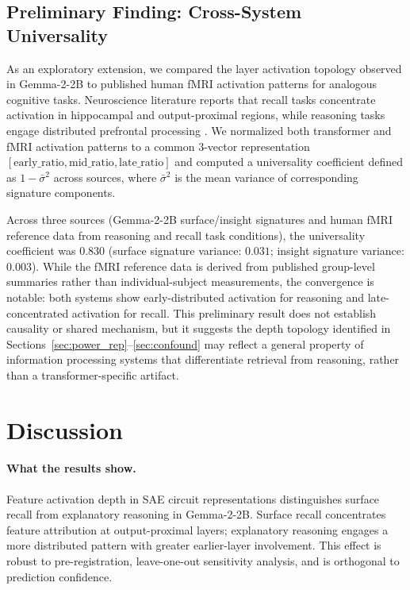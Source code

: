 \documentclass[10pt]{article}
\begin{document}
\subsection{Preliminary Finding: Cross-System Universality}
\label{sec:universality}

As an exploratory extension, we compared the layer activation topology observed in Gemma-2-2B to published human fMRI activation patterns for analogous cognitive tasks. Neuroscience literature reports that recall tasks concentrate activation in hippocampal and output-proximal regions, while reasoning tasks engage distributed prefrontal processing \citep{miller2001integrative}. We normalized both transformer and fMRI activation patterns to a common 3-vector representation $[\text{early\_ratio}, \text{mid\_ratio}, \text{late\_ratio}]$ and computed a universality coefficient defined as $1 - \bar{\sigma}^2$ across sources, where $\bar{\sigma}^2$ is the mean variance of corresponding signature components.

Across three sources (Gemma-2-2B surface/insight signatures and human fMRI reference data from reasoning and recall task conditions), the universality coefficient was $0.830$ (surface signature variance: $0.031$; insight signature variance: $0.003$). While the fMRI reference data is derived from published group-level summaries rather than individual-subject measurements, the convergence is notable: both systems show early-distributed activation for reasoning and late-concentrated activation for recall. This preliminary result does not establish causality or shared mechanism, but it suggests the depth topology identified in Sections~\ref{sec:power_rep}--\ref{sec:confound} may reflect a general property of information processing systems that differentiate retrieval from reasoning, rather than a transformer-specific artifact.

\section{Discussion}

\paragraph{What the results show.}
Feature activation depth in SAE circuit representations distinguishes surface recall from explanatory reasoning in Gemma-2-2B. Surface recall concentrates feature attribution at output-proximal layers; explanatory reasoning engages a more distributed pattern with greater earlier-layer involvement. This effect is robust to pre-registration, leave-one-out sensitivity analysis, and is orthogonal to prediction confidence.
\end{document}
